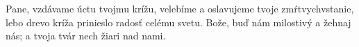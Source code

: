 Pane, vzdávame úctu tvojmu krížu,
velebíme a oslavujeme tvoje zmŕtvychvstanie,
lebo drevo kríža prinieslo radosť celému svetu.
\versseparator
Bože, buď nám milostivý a žehnaj nás;
a tvoja tvár nech žiari nad nami.